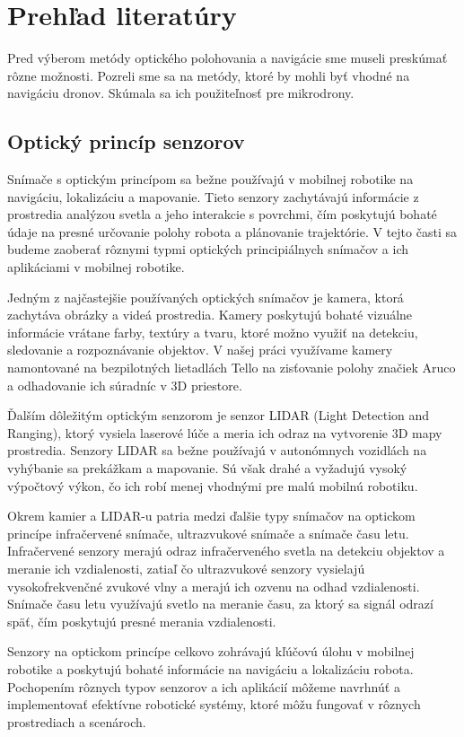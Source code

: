 \section{Prehľad literatúry}
Pred výberom metódy optického polohovania a navigácie sme museli preskúmať rôzne možnosti. Pozreli sme sa na metódy, ktoré by mohli byť vhodné na navigáciu dronov. Skúmala sa ich použiteľnosť pre mikrodrony.

\subsection{Optický princíp senzorov}
Snímače s optickým princípom sa bežne používajú v mobilnej robotike na navigáciu, lokalizáciu a mapovanie. Tieto senzory zachytávajú informácie z prostredia analýzou svetla a jeho interakcie s povrchmi, čím poskytujú bohaté údaje na presné určovanie polohy robota a plánovanie trajektórie. V tejto časti sa budeme zaoberať rôznymi typmi optických principiálnych snímačov a ich aplikáciami v mobilnej robotike.

Jedným z najčastejšie používaných optických snímačov je kamera, ktorá zachytáva obrázky a videá prostredia. Kamery poskytujú bohaté vizuálne informácie vrátane farby, textúry a tvaru, ktoré možno využiť na detekciu, sledovanie a rozpoznávanie objektov. V našej práci využívame kamery namontované na bezpilotných lietadlách Tello na zisťovanie polohy značiek Aruco a odhadovanie ich súradníc v 3D priestore.

Ďalším dôležitým optickým senzorom je senzor LIDAR (Light Detection and Ranging), ktorý vysiela laserové lúče a meria ich odraz na vytvorenie 3D mapy prostredia. Senzory LIDAR sa bežne používajú v autonómnych vozidlách na vyhýbanie sa prekážkam a mapovanie. Sú však drahé a vyžadujú vysoký výpočtový výkon, čo ich robí menej vhodnými pre malú mobilnú robotiku.
 
Okrem kamier a LIDAR-u patria medzi ďalšie typy snímačov na optickom princípe infračervené snímače, ultrazvukové snímače a snímače času letu. Infračervené senzory merajú odraz infračerveného svetla na detekciu objektov a meranie ich vzdialenosti, zatiaľ čo ultrazvukové senzory vysielajú vysokofrekvenčné zvukové vlny a merajú ich ozvenu na odhad vzdialenosti. Snímače času letu využívajú svetlo na meranie času, za ktorý sa signál odrazí späť, čím poskytujú presné merania vzdialenosti.

Senzory na optickom princípe celkovo zohrávajú kľúčovú úlohu v mobilnej robotike a poskytujú bohaté informácie na navigáciu a lokalizáciu robota. Pochopením rôznych typov senzorov a ich aplikácií môžeme navrhnúť a implementovať efektívne robotické systémy, ktoré môžu fungovať v rôznych prostrediach a scenároch.

